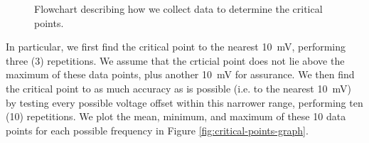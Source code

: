 \begin{figure}[!htb]
    \caption{
        \label{fig:data-collection-flowchart}
        Flowchart describing how we collect data to determine the critical
        points.
    }
\end{figure}

In particular, we first find the critical point to the nearest 10~mV, performing
three (3) repetitions. We assume that the crticial point does not lie above the
maximum of these data points, plus another 10~mV for assurance. We then find the
critical point to as much accuracy as is possible (i.e. to the nearest 10~mV)
by testing every possible voltage offset within this narrower range, performing
ten (10) repetitions. We plot the mean, minimum, and maximum of these 10 data
points for each possible frequency in Figure \ref{fig:critical-points-graph}.

